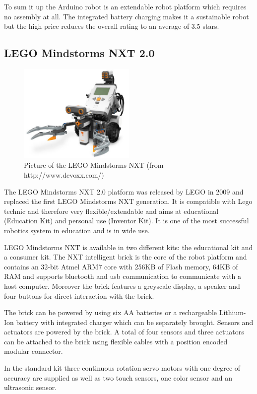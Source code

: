 \documentclass[11pt,a4paper]{article}
\begin{document}
To sum it up the Arduino robot is an extendable robot platform which requires no assembly at all. The integrated battery charging makes it a sustainable robot but the high price reduces the overall rating to an average of 3.5 stars.

\subsection{LEGO Mindstorms NXT 2.0}
\begin{figure}[H]
  \centering
  \includegraphics[width=0.5\textwidth]{images/mindstorms.jpg}
  \caption{Picture of the LEGO Mindstorms NXT (from http://www.devoxx.com/)}
\end{figure}

The LEGO Mindstorms NXT 2.0 platform was released by LEGO in 2009 and replaced the first LEGO Mindstorms NXT generation. It is compatible with Lego technic and therefore very flexible/extendable and aims at educational (Education Kit) and personal use (Inventor Kit). It is one of the most successful robotics system in education and is in wide use.

LEGO Mindstorms NXT is available in two different kits: the educational kit and a consumer kit. The NXT intelligent brick is the core of the robot platform and contains an 32-bit Atmel ARM7 core with 256KB of Flash memory, 64KB of RAM and supports bluetooth and usb communication to communicate with a host computer. Moreover the brick features a greyscale display, a speaker and four buttons for direct interaction with the brick.

The brick can be powered by using six AA batteries or a rechargeable Lithium-Ion battery with integrated charger which can be separately brought. Sensors and actuators are powered by the brick. A total of four sensors and three actuators can be attached to the brick using flexible cables with a position encoded modular connector.

In the standard kit three continuous rotation servo motors with one degree of accuracy are supplied as well as two touch sensors, one color sensor and an ultrasonic sensor. 
\end{document}
